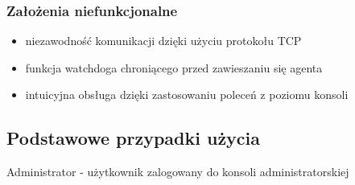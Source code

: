 \documentclass[paper=a4, fontsize=11pt]{scrartcl} %
\begin{document}
\subsubsection*{Założenia niefunkcjonalne}
\begin{itemize}
\item niezawodność komunikacji dzięki użyciu protokołu TCP
\item funkcja watchdoga chroniącego przed zawieszaniu się agenta
\item intuicyjna obsługa dzięki zastosowaniu poleceń z poziomu konsoli
\end{itemize}


\subsection{Podstawowe przypadki użycia}
Administrator - użytkownik zalogowany do konsoli administratorskiej
\end{document}
